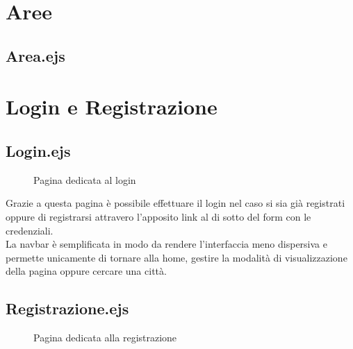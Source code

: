 \newpage
\section{Aree}

\subsection{Area.ejs}

\section{Login e Registrazione}

\subsection{Login.ejs}

\begin{figure}[ht]
    \centering
    \caption{Pagina dedicata al login}
\end{figure}

Grazie a questa pagina è possibile effettuare il login nel caso si sia già registrati oppure di registrarsi attravero l'apposito
link al di sotto del form con le credenziali.\\
La navbar è semplificata in modo da rendere l'interfaccia meno dispersiva e permette unicamente di tornare alla home, gestire
la modalità di visualizzazione della pagina oppure cercare una città.

\newpage
\subsection{Registrazione.ejs}

\begin{figure}[ht]
    \centering
    \caption{Pagina dedicata alla registrazione}
\end{figure}

